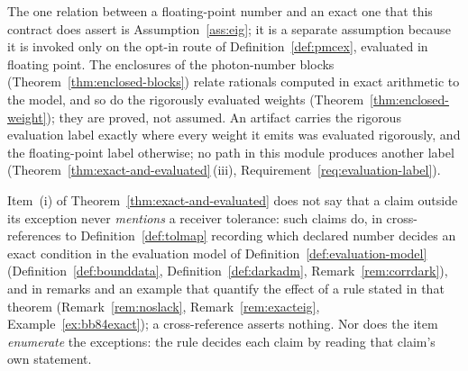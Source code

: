 
\begin{remark}\label{rem:exactness-scope}
The one relation between a floating-point number and an exact one that this
contract does assert is Assumption~\ref{ass:eig}; it is a separate assumption
because it is invoked only on the opt-in route of Definition~\ref{def:pmcex},
evaluated in floating point.
The enclosures of the photon-number blocks
(Theorem~\ref{thm:enclosed-blocks}) relate rationals computed in exact
arithmetic to the model, and so do the rigorously evaluated weights
(Theorem~\ref{thm:enclosed-weight}); they are proved, not assumed.
An artifact carries the rigorous evaluation label exactly where every weight
it emits was evaluated rigorously, and the floating-point label otherwise; no
path in this module produces another label
(Theorem~\ref{thm:exact-and-evaluated}\,(iii),
Requirement~\ref{req:evaluation-label}).

Item~(i) of Theorem~\ref{thm:exact-and-evaluated} does not say that a claim
outside its exception never \emph{mentions} a receiver tolerance: such claims
do, in cross-references to Definition~\ref{def:tolmap} recording which
declared number decides an exact condition in the evaluation model of
Definition~\ref{def:evaluation-model} (Definition~\ref{def:bounddata},
Definition~\ref{def:darkadm}, Remark~\ref{rem:corrdark}), and in remarks and
an example that quantify the effect of a rule stated in that theorem
(Remark~\ref{rem:noslack}, Remark~\ref{rem:exacteig},
Example~\ref{ex:bb84exact}); a cross-reference asserts nothing. Nor does the
item \emph{enumerate} the exceptions: the rule decides each claim by reading
that claim's own statement.
\end{remark}
